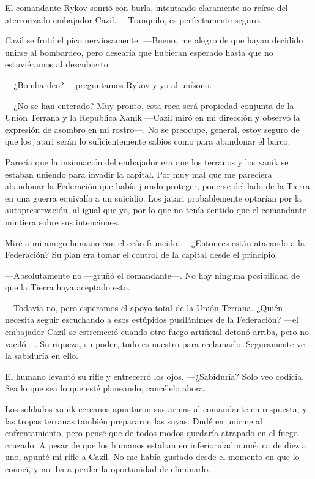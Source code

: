 El comandante Rykov sonrió con burla, intentando claramente no reírse del aterrorizado embajador Cazil. —Tranquilo, es perfectamente seguro.

Cazil se frotó el pico nerviosamente. —Bueno, me alegro de que hayan decidido unirse al bombardeo, pero desearía que hubieran esperado hasta que no estuviéramos al descubierto.

 —¿Bombardeo? —preguntamos Rykov y yo al unísono.

 —¿No se han enterado? Muy pronto, esta roca será propiedad conjunta de la Unión Terrana y la República Xanik —Cazil miró en mi dirección y observó la expresión de asombro en mi rostro—. No se preocupe, general, estoy seguro de que los jatari serán lo suficientemente sabios como para abandonar el barco.

Parecía que la insinuación del embajador era que los terranos y los xanik se estaban uniendo para invadir la capital. Por muy mal que me pareciera abandonar la Federación que había jurado proteger, ponerse del lado de la Tierra en una guerra equivalía a un suicidio. Los jatari probablemente optarían por la autopreservación, al igual que yo, por lo que no tenía sentido que el comandante mintiera sobre sus intenciones.

Miré a mi amigo humano con el ceño fruncido. —¿Entonces están atacando a la Federación? Su plan era tomar el control de la capital desde el principio.

—Absolutamente no —gruñó el comandante—. No hay ninguna posibilidad de que la Tierra haya aceptado esto.

—Todavía no, pero esperamos el apoyo total de la Unión Terrana. ¿Quién necesita seguir escuchando a esos estúpidos pusilánimes de la Federación? —el embajador Cazil se estremeció cuando otro fuego artificial detonó arriba, pero no vaciló—. Su riqueza, su poder, todo es nuestro para reclamarlo. Seguramente ve la sabiduría en ello.

El humano levantó su rifle y entrecerró los ojos. —¿Sabiduría? Solo veo codicia. Sea lo que sea lo que esté planeando, cancélelo ahora.

Los soldados xanik cercanos apuntaron sus armas al comandante en respuesta, y las tropas terranas también prepararon las suyas. Dudé en unirme al enfrentamiento, pero pensé que de todos modos quedaría atrapado en el fuego cruzado. A pesar de que los humanos estaban en inferioridad numérica de diez a uno, apunté mi rifle a Cazil. No me había gustado desde el momento en que lo conocí, y no iba a perder la oportunidad de eliminarlo.

